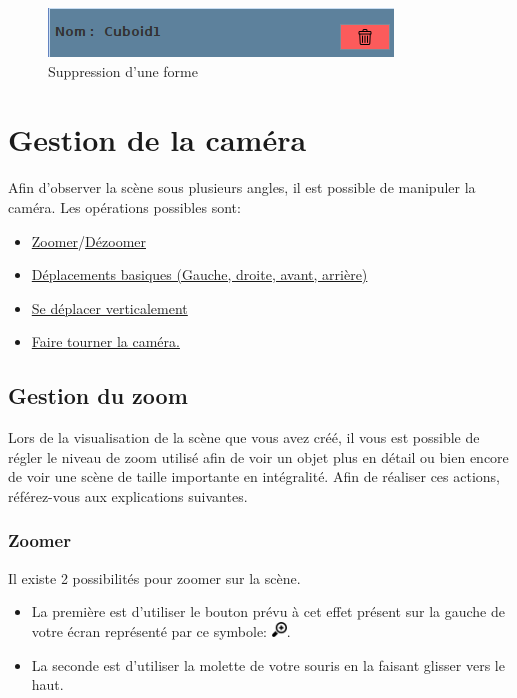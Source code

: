 \documentclass[11pt]{report}
\begin{document}
\begin{figure}[h]
  \centering
  \includegraphics{./supprimerForme.png}
  \caption{Suppression d'une forme}
\end{figure}

\chapter{Gestion de la caméra}


Afin d'observer la scène sous plusieurs angles, il est possible de manipuler la caméra. Les opérations possibles sont:
\begin{itemize}
        \item \hyperlink{zoom}{Zoomer}/\hyperlink{dezoom}{Dézoomer}
        \item \hyperlink{move}{Déplacements basiques (Gauche, droite, avant, arrière)}
        \item \hyperlink{moveV}{Se déplacer verticalement}
        \item \hyperlink{rotate}{Faire tourner la caméra.}
\end{itemize}

\section{Gestion du zoom}

Lors de la visualisation de la scène que vous avez créé, il vous est possible de régler le niveau de zoom utilisé afin de voir un objet plus en détail ou bien encore de voir une scène de taille importante en intégralité. Afin de réaliser ces actions, référez-vous aux explications suivantes.


\subsection{Zoomer}

\hypertarget{zoom}{Il existe 2 possibilités pour zoomer sur la scène.}
\begin{itemize}
        \item La première est d'utiliser le bouton prévu à cet effet présent sur la gauche de votre écran représenté par ce symbole: \includegraphics[width=0.4cm]{./btn_zoom-in.png}.
        \item La seconde est d'utiliser la molette de votre souris en la faisant glisser vers le haut.
\end{itemize}
\end{document}
